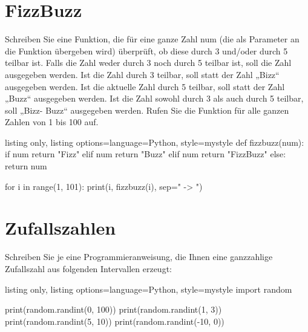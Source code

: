 \documentclass[11pt, oneside]{book}
\begin{document}
\section{FizzBuzz}
Schreiben Sie eine Funktion, die für eine ganze Zahl num (die als Parameter an die Funktion übergeben wird) überprüft, ob diese durch 3 und/oder durch 5 teilbar ist. Falls die Zahl weder durch 3 noch durch 5 teilbar ist, soll die Zahl ausgegeben werden. Ist die Zahl durch 3 teilbar, soll statt der Zahl „Bizz“ ausgegeben werden. Ist die aktuelle Zahl durch 5 teilbar, soll statt der Zahl „Buzz“ ausgegeben werden. Ist die Zahl sowohl durch 3 als auch durch 5 teilbar, soll „Bizz- Buzz“ ausgegeben werden. Rufen Sie die Funktion für alle ganzen Zahlen von 1 bis 100 auf.
\begin{tcblisting}{listing only, listing options={language=Python, style=mystyle}}
def fizzbuzz(num):
    if num %
        return "Fizz"
    elif num %
        return "Buzz"
    elif num %
        return "FizzBuzz"
    else:
        return num
    
for i in range(1, 101):
    print(i, fizzbuzz(i), sep=" -> ")
\end{tcblisting}


\section{Zufallszahlen}
Schreiben Sie je eine Programmieranweisung, die Ihnen eine ganzzahlige Zufallszahl aus folgenden Intervallen erzeugt:
\begin{tcblisting}{listing only, listing options={language=Python, style=mystyle}}
import random

print(random.randint(0, 100))
print(random.randint(1, 3))
print(random.randint(5, 10))
print(random.randint(-10, 0))
\end{tcblisting}
\end{document}
